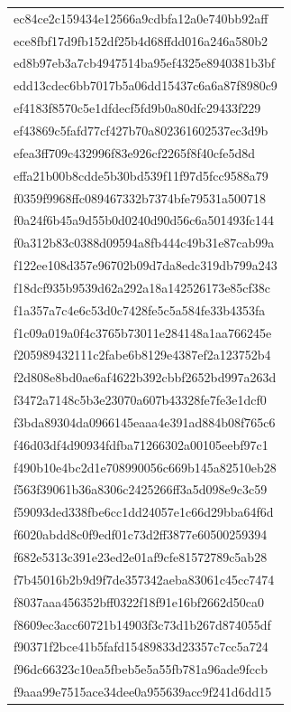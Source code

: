 \begin{tabular}{l}
ec84ce2c159434e12566a9cdbfa12a0e740bb92aff \\
ece8fbf17d9fb152df25b4d68ffdd016a246a580b2 \\
ed8b97eb3a7cb4947514ba95ef4325e8940381b3bf \\
edd13cdec6bb7017b5a06dd15437c6a6a87f8980c9 \\
ef4183f8570c5e1dfdecf5fd9b0a80dfc29433f229 \\
ef43869c5fafd77cf427b70a802361602537ec3d9b \\
efea3ff709c432996f83e926cf2265f8f40cfe5d8d \\
effa21b00b8cdde5b30bd539f11f97d5fcc9588a79 \\
f0359f9968ffc089467332b7374bfe79531a500718 \\
f0a24f6b45a9d55b0d0240d90d56c6a501493fc144 \\
f0a312b83c0388d09594a8fb444c49b31e87cab99a \\
f122ee108d357e96702b09d7da8edc319db799a243 \\
f18dcf935b9539d62a292a18a142526173e85cf38c \\
f1a357a7c4e6c53d0c7428fe5c5a584fe33b4353fa \\
f1c09a019a0f4c3765b73011e284148a1aa766245e \\
f205989432111c2fabe6b8129e4387ef2a123752b4 \\
f2d808e8bd0ae6af4622b392cbbf2652bd997a263d \\
f3472a7148c5b3e23070a607b43328fe7fe3e1dcf0 \\
f3bda89304da0966145eaaa4e391ad884b08f765c6 \\
f46d03df4d90934fdfba71266302a00105eebf97c1 \\
f490b10e4bc2d1e708990056c669b145a82510eb28 \\
f563f39061b36a8306c2425266ff3a5d098e9c3c59 \\
f59093ded338fbe6cc1dd24057e1c66d29bba64f6d \\
f6020abdd8c0f9edf01c73d2ff3877e60500259394 \\
f682e5313c391e23ed2e01af9cfe81572789c5ab28 \\
f7b45016b2b9d9f7de357342aeba83061c45cc7474 \\
f8037aaa456352bff0322f18f91e16bf2662d50ca0 \\
f8609ec3acc60721b14903f3c73d1b267d874055df \\
f90371f2bce41b5fafd15489833d23357c7cc5a724 \\
f96dc66323c10ea5fbeb5e5a55fb781a96ade9fccb \\
f9aaa99e7515ace34dee0a955639acc9f241d6dd15 \\

\end{tabular}
